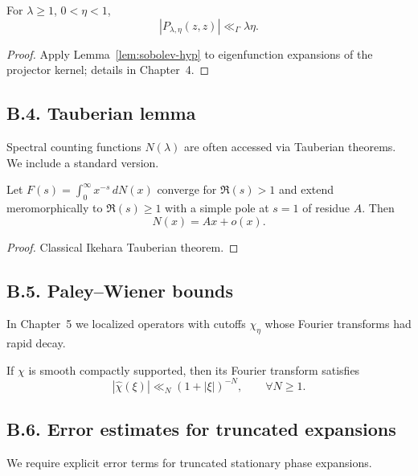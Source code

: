 \begin{corollary}\label{cor:proj-bound}
For $\lambda\ge 1$, $0<\eta<1$,
\[
|P_{\lambda,\eta}(z,z)| \ll_\Gamma \lambda \eta.
\]
\end{corollary}

\begin{proof}
Apply Lemma~\ref{lem:sobolev-hyp} to eigenfunction expansions of the projector
kernel; details in Chapter~4.
\end{proof}

\subsection*{B.4. Tauberian lemma}

\noindent
Spectral counting functions $N(\lambda)$ are often accessed via Tauberian
theorems. We include a standard version.

\begin{lemma}\label{lem:tauber}
Let $F(s)=\int_0^\infty x^{-s}\,dN(x)$ converge for $\Re(s)>1$ and extend
meromorphically to $\Re(s)\ge 1$ with a simple pole at $s=1$ of residue $A$.
Then
\[
N(x) = Ax + o(x).
\]
\end{lemma}

\begin{proof}
Classical Ikehara Tauberian theorem.
\end{proof}

\subsection*{B.5. Paley–Wiener bounds}

\noindent
In Chapter~5 we localized operators with cutoffs $\chi_\eta$ whose Fourier
transforms had rapid decay.

\begin{lemma}\label{lem:paley}
If $\chi$ is smooth compactly supported, then its Fourier transform satisfies
\[
|\hat{\chi}(\xi)| \ll_N (1+|\xi|)^{-N},\qquad \forall N\ge 1.
\]
\end{lemma}

\subsection*{B.6. Error estimates for truncated expansions}

\noindent
We require explicit error terms for truncated stationary phase expansions.

